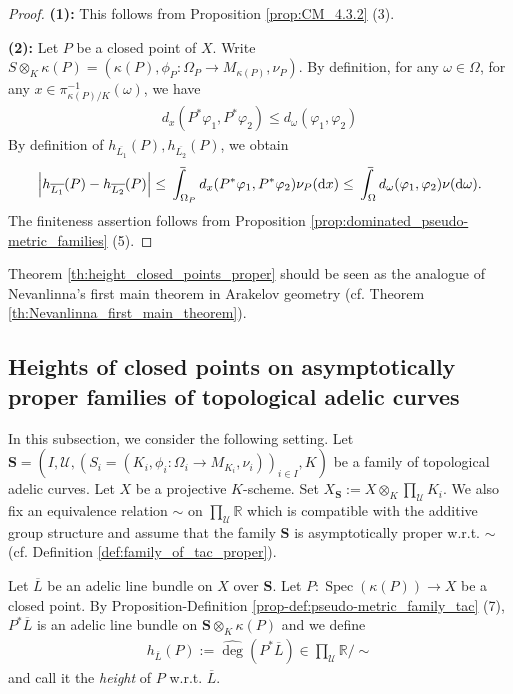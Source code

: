 \documentclass [11pt,reqno]{amsart}
\def\bR{{\mathbb{R}}}
\newcommand{\1}{\mathmybb{1}}
\def\cU{{\mathcal{U}}}
\def\diff{\mathrm{d}}
\def\Spec{\operatorname{Spec}}
\def\upint{\mathchoice%
    {\mkern13mu\overline{\vphantom{\intop}\mkern7mu}\mkern-20mu}%
    {\mkern7mu\overline{\vphantom{\intop}\mkern7mu}\mkern-14mu}%
    {\mkern7mu\overline{\vphantom{\intop}\mkern7mu}\mkern-14mu}%
    {\mkern7mu\overline{\vphantom{\intop}\mkern7mu}\mkern-14mu}%
  \int}
\begin{document}
\begin{proof}
\textbf{(1):} This follows from Proposition \ref{prop:CM_4.3.2} (3). 

\textbf{(2):} Let $P$ be a closed point of $X$. Write $S \otimes_{K} \kappa(P)=(\kappa(P),\phi_P : \Omega_{P} \to M_{\kappa(P)},\nu_P)$. By definition, for any $\omega\in \Omega$, for any $x \in \pi_{\kappa(P)/K}^{-1}(\omega)$, we have
\begin{align*}
d_{x}(P^{\ast}\varphi_1,P^{\ast}\varphi_2) \leq d_{\omega}(\varphi_1,\varphi_2)
\end{align*}
By definition of $h_{\overline{L_1}}(P),h_{\overline{L_2}}(P)$, we obtain
\begin{align*}
\left|h_{\overline{L_1}}(P)-h_{\overline{L_2}}(P)\right| \leq \upint_{\Omega_P}d_{x}(P^{\ast}\varphi_1,P^{\ast}\varphi_2)\nu_P(\diff x)\leq \upint_{\Omega}d_{\omega}(\varphi_1,\varphi_2)\nu(\diff\omega).
\end{align*}
The finiteness assertion follows from Proposition \ref{prop:dominated_pseudo-metric_families} (5).
\end{proof}

\begin{remark}
\label{rem:height_closed_points_proper_analogy_Nevanlinna}
Theorem \ref{th:height_closed_points_proper} should be seen as the analogue of Nevanlinna's first main theorem in Arakelov geometry (cf. Theorem \ref{th:Nevanlinna_first_main_theorem}).
\end{remark}

\subsection{Heights of closed points on asymptotically proper families of topological adelic curves}
\label{sub:height_of_closed_points_family}

In this subsection, we consider the following setting. Let $\mathbf{S}=(I,\cU,(S_{i}=(K_{i},\phi_{i}:\Omega_{i}\to M_{K_{i}},\nu_{i}))_{i\in I},K)$ be a family of topological adelic curves. Let $X$ be a projective $K$-scheme. Set $X_{\mathbf{S}}:=X\otimes_{K}\prod_{\cU}K_{i}$. We also fix an equivalence relation $\sim$ on $\prod_{\cU}\bR$ which is compatible with the additive group structure and assume that the family $\mathbf{S}$ is asymptotically proper w.r.t. $\sim$ (cf. Definition \ref{def:family_of_tac_proper}). 

\begin{definition}
\label{def:height_closed_points_family}
Let $\overline{L}$ be an adelic line bundle on $X$ over $\mathbf{S}$. Let $P: \Spec(\kappa(P))\to X$ be a closed point. By Proposition-Definition \ref{prop-def:pseudo-metric_family_tac} (7), $P^{\ast}\overline{L}$ is an adelic line bundle on $\mathbf{S}\otimes_{K}\kappa(P)$ and we define
\begin{align*}
h_{\overline{L}}(P) := \widehat{\deg}(P^{\ast}\overline{L}) \in \displaystyle\prod_{\cU}\bR/\sim
\end{align*}
and call it the \emph{height} of $P$ w.r.t. $\overline{L}$.
\end{definition}
\end{document}
